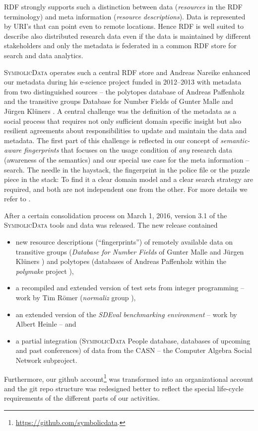 \documentclass[a4paper,11pt]{article}
\def\SD{\textsc{SymbolicData}}
\begin{document}
RDF strongly supports such a distinction between data (\emph{resources} in the
RDF terminology) and meta information (\emph{resource descriptions}). Data is
represented by URI's that can point even to remote locations.  Hence RDF is
well suited to describe also distributed research data even if the data is
maintained by different stakeholders and only the metadata is federated in a
common RDF store for search and data analytics.

{\SD} operates such a central RDF store \cite{sdstore} and Andreas Nareike
enhanced our metadata during his e-science project funded in 2012--2013 with
metadata from two distinguished sources -- the polytopes database of Andreas
Paffenholz \cite{Paffenholz} and the transitive groups Database for Number
Fields of Gunter Malle and J\"urgen Kl\"uners \cite{MalleKlueners}.  A central
challenge was the definition of the metadata as a social process that requires
not only sufficient domain specific insight but also resilient agreements about
responsibilities to update and maintain the data and metadata.  The first part
of this challenge is reflected in our concept of \emph{semantic-aware
  fingerprints} that focuses on the usage condition of \emph{any} research
data (awareness of the semantics) and our special use case for the meta
information -- search. The needle in the haystack, the fingerprint in the
police file or the puzzle piece in the stack: To find it a clear domain model
and a clear search strategy are required, and both are not independent one from
the other.  For more details we refer to \cite{icms-16}.

After a certain consolidation process on March 1, 2016, version 3.1 of the
{\SD} tools and data was released. The new release contained
\begin{itemize}
\item new resource descriptions (``fingerprints'') of remotely available data
  on transitive groups (\emph{Database for Number Fields} of Gunter Malle and
  J\"urgen Kl\"uners \cite{MalleKlueners}) and polytopes (databases of Andreas
  Paffenholz \cite{Paffenholz} within the \emph{polymake} project
  \cite{polymake}),
\item a recompiled and extended version of test sets from integer programming
  -- work by Tim R\"omer (\emph{normaliz} group \cite{normaliz}), 
\item an extended version of the \emph{SDEval benchmarking environment} -- work
  by Albert Heinle \cite{heinle-15} -- and
\item a partial integration ({\SD} People database, databases of upcoming and
  past conferences) of data from the CASN -- the Computer Algebra Social
  Network subproject.
\end{itemize}
Furthermore, our github
account\footnote{\url{https://github.com/symbolicdata}.} was transformed into
an organizational account and the git repo structure was redesigned better to
reflect the special life-cycle requirements of the different parts of our
activities.
\end{document}
